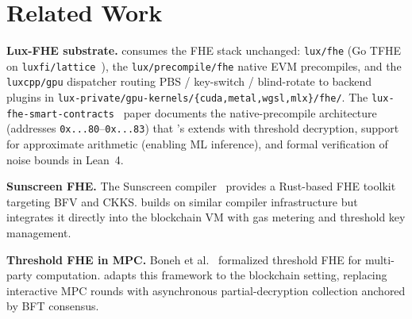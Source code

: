 \section{Related Work}

\label{sec:related}

\textbf{Lux-FHE substrate.} \Zoo{} consumes the \Lux{} FHE stack
unchanged: \texttt{lux/fhe} (Go TFHE on \texttt{luxfi/lattice}~\cite{lux-fhe-go}),
the \texttt{lux/precompile/fhe} native EVM precompiles, and the
\texttt{luxcpp/gpu} dispatcher routing PBS / key-switch /
blind-rotate to backend plugins in
\texttt{lux-private/gpu-kernels/\{cuda,metal,wgsl,mlx\}/fhe/}. The
\Lux{} \texttt{lux-fhe-smart-contracts}~\cite{lux-fhe-smart-contracts}
paper documents the native-precompile architecture (addresses
\texttt{0x...80}--\texttt{0x...83}) that \Zoo{}'s \TChain{} extends
with threshold decryption, \CKKS{} support for approximate arithmetic
(enabling ML inference), and formal verification of noise bounds in
Lean~4.

\textbf{Sunscreen FHE.} The Sunscreen compiler~\cite{sunscreen2023} provides a Rust-based FHE toolkit targeting BFV and CKKS. \Zoo{} builds on similar compiler infrastructure but integrates it directly into the blockchain VM with gas metering and threshold key management.

\textbf{Threshold FHE in MPC.} Boneh et al.~\cite{boneh2018threshold} formalized threshold FHE for multi-party computation. \Zoo{} adapts this framework to the blockchain setting, replacing interactive MPC rounds with asynchronous partial-decryption collection anchored by BFT consensus.

